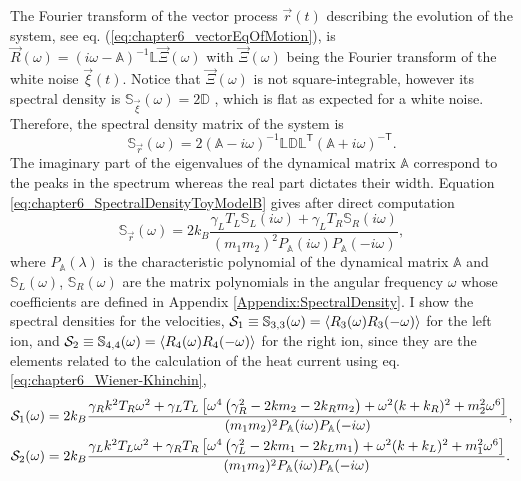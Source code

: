 The Fourier transform of the vector process $\overrightarrow{r}(t)$ describing the evolution of the system, see eq. (\ref{eq:chapter6_vectorEqOfMotion}),
is $\overrightarrow{R}(\omega) = \left( i \omega - \mathbb{A} \right)^{-1}\mathbb{L}\overrightarrow{\Xi}(\omega)$ with $\overrightarrow{\Xi}(\omega)$ being the Fourier transform of the white noise $\overrightarrow{\xi}(t)$. Notice that $\overrightarrow{\Xi}(\omega)$ is not square-integrable, however its spectral density is $\mathbb{S}_{\overrightarrow{\xi}}(\omega) = 2 \mathbb{D}$ \cite{Sarkka2019}, which is flat as expected for a white noise. Therefore, the spectral density matrix of the system is
%
\begin{equation}
  \mathbb{S}_{\overrightarrow{r}} (\omega)= 2 \left(  \mathbb{A} - i\omega\right)^{-1}\mathbb{L}\mathbb{D}\mathbb{L}^\mathsf{T}\left(  \mathbb{A} + i\omega\right)^{-\mathsf{T}}.
  \label{eq:chapter6_SpectralDensityToyModelB}
\end{equation}
%
The imaginary part of the eigenvalues of the dynamical matrix $\mathbb{A}$ correspond to the peaks in the spectrum whereas the real part dictates their width. Equation \eqref{eq:chapter6_SpectralDensityToyModelB} gives after direct computation
%
\begin{equation}
  \mathbb{S}_{\overrightarrow{r}}(\omega) = 2 k_B \frac{\gamma_L T_L\mathbb{S}_L(i\omega)+\gamma_L T_R\mathbb{S}_R(i\omega)}{(m_1 m_2)^2 P_\mathbb{A}(i\omega)P_\mathbb{A}(-i\omega)},
\end{equation}
%
where $P_\mathbb{A}(\lambda)$ is the characteristic polynomial of the dynamical matrix $\mathbb{A}$ and $\mathbb{S}_L(\omega)$, $\mathbb{S}_R(\omega)$ are the matrix polynomials in the angular frequency $\omega$ whose coefficients are defined in Appendix \ref{Appendix:SpectralDensity}. I show the spectral densities for the velocities, ${\cal{S}}_1\equiv\mathbb{S}_{3,3}(\omega) = \expval{R_3(\omega)R_3(-\omega)}$ for the left ion, and ${\cal S}_2\equiv\mathbb{S}_{4,4}(\omega) = \expval{R_4(\omega)R_4(-\omega)}$ for the right ion, since they are the elements related to the calculation of the heat current using eq. \eqref{eq:chapter6_Wiener-Khinchin},
%
  \begin{align}
    {\cal S}_1(\omega) &= 2 k_B \frac{\gamma_R k^2 T_R \omega ^2+\gamma_L T_L \left[\omega ^4 \left(\gamma_R^2-2 k m_2-2 k_R m_2\right)+\omega ^2 (k+k_R)^2+m_2^2 \omega ^6\right]}{(m_1 m_2)^2 P_\mathbb{A}(i\omega)P_\mathbb{A}(-i\omega)},\nonumber\\
{\cal S}_2(\omega)
&= 2 k_B \frac{\gamma_L k^2 T_L \omega ^2+\gamma_R T_R \left[\omega ^4 \left(\gamma_L^2-2 k m_1-2 k_L m_1\right)+\omega ^2 (k+k_L)^2+m_1^2 \omega ^6\right]}{(m_1 m_2)^2 P_\mathbb{A}(i\omega)P_\mathbb{A}(-i\omega)}.
    \label{eq:chapter6_SpectralDensitiesVelocities}
  \end{align}
